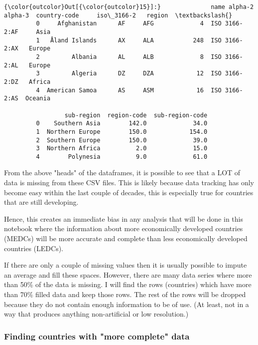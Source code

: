 \documentclass[11pt]{article}
\begin{document}
\begin{Verbatim}[commandchars=\\\{\}]
{\color{outcolor}Out[{\color{outcolor}15}]:}              name alpha-2 alpha-3  country-code     iso\_3166-2   region  \textbackslash{}
         0     Afghanistan      AF     AFG             4  ISO 3166-2:AF     Asia   
         1   Åland Islands      AX     ALA           248  ISO 3166-2:AX   Europe   
         2         Albania      AL     ALB             8  ISO 3166-2:AL   Europe   
         3         Algeria      DZ     DZA            12  ISO 3166-2:DZ   Africa   
         4  American Samoa      AS     ASM            16  ISO 3166-2:AS  Oceania   
         
                 sub-region  region-code  sub-region-code  
         0    Southern Asia        142.0             34.0  
         1  Northern Europe        150.0            154.0  
         2  Southern Europe        150.0             39.0  
         3  Northern Africa          2.0             15.0  
         4        Polynesia          9.0             61.0  
\end{Verbatim}
            
    From the above "heads" of the dataframes, it is possible to see that a
LOT of data is missing from these CSV files. This is likely because data
tracking has only become easy within the last couple of decades, this is
especially true for countries that are still developing.

Hence, this creates an immediate bias in any analysis that will be done
in this notebook where the information about more economically developed
countries (MEDCs) will be more accurate and complete than less
economically developed countries (LEDCs).

If there are only a couple of missing values then it is usually possible
to impute an average and fill these spaces. However, there are many data
series where more than 50\% of the data is missing. I will find the rows
(countries) which have more than 70\% filled data and keep those rows.
The rest of the rows will be dropped because they do not contain enough
information to be of use. (At least, not in a way that produces anything
non-artificial or low resolution.)

    \subsubsection{Finding countries with "more complete"
data}\label{finding-countries-with-more-complete-data}
\end{document}
